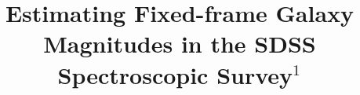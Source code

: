 \documentclass[10pt,preprint]{aastex}
\newcounter{address}
\begin{document}
 

\title{Estimating Fixed-frame Galaxy Magnitudes in the SDSS
Spectroscopic Survey$^1$}


\end{document}
